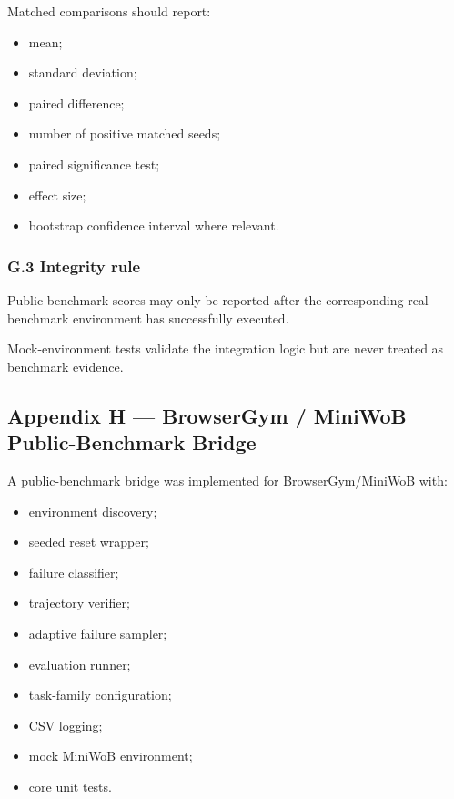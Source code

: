 \documentclass[
]{article}
\providecommand{\tightlist}{%
  \setlength{\itemsep}{0pt}\setlength{\parskip}{0pt}}
\begin{document}
Matched comparisons should report:

\begin{itemize}
\tightlist
\item
  mean;
\item
  standard deviation;
\item
  paired difference;
\item
  number of positive matched seeds;
\item
  paired significance test;
\item
  effect size;
\item
  bootstrap confidence interval where relevant.
\end{itemize}

\subsubsection{G.3 Integrity rule}\label{g.3-integrity-rule}

Public benchmark scores may only be reported after the corresponding
real benchmark environment has successfully executed.

Mock-environment tests validate the integration logic but are never
treated as benchmark evidence.

\subsection{Appendix H --- BrowserGym / MiniWoB Public-Benchmark
Bridge}\label{appendix-h-browsergym-miniwob-public-benchmark-bridge}

A public-benchmark bridge was implemented for BrowserGym/MiniWoB with:

\begin{itemize}
\tightlist
\item
  environment discovery;
\item
  seeded reset wrapper;
\item
  failure classifier;
\item
  trajectory verifier;
\item
  adaptive failure sampler;
\item
  evaluation runner;
\item
  task-family configuration;
\item
  CSV logging;
\item
  mock MiniWoB environment;
\item
  core unit tests.
\end{itemize}
\end{document}
